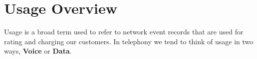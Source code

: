 \documentclass[12pt,twoside]{article}
\begin{document}
\addtolength{\oddsidemargin}{0in}
\addtolength{\evensidemargin}{-01.25in}
\addtolength{\textwidth}{1.4in}
\addtolength{\topmargin}{-1.25in}
\addtolength{\textheight}{2.45in}
\setcounter{tocdepth}{3}
\vspace*{1cm} 
\newpage
{}
\setcounter{tocdepth}{2}
\pagestyle{fancy}
\fancyhf[C]{}
\setcounter{tocdepth}{2}
\tableofcontents
 \newpage
{}
\section{Usage Overview}
\label{sec:orgheadline8}
Usage is a broad term used to refer to network event records that are used for rating and charging our customers. In telephony we tend to think of usage
in two ways, \textbf{Voice} or \textbf{Data}.\\
\end{document}

